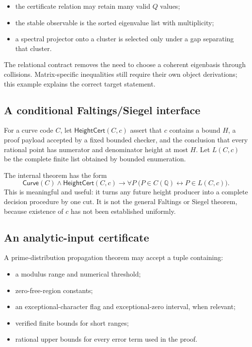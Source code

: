 \begin{itemize}
  \item the certificate relation may retain many valid $Q$ values;
  \item the stable observable is the sorted eigenvalue list with multiplicity;
  \item a spectral projector onto a cluster is selected only under a gap separating that cluster.
\end{itemize}

The relational contract removes the need to choose a coherent eigenbasis through collisions.  Matrix-specific inequalities still require their own object derivations; this example explains the correct target statement.

\subsection{A conditional Faltings/Siegel interface}

For a curve code $C$, let $\mathsf{HeightCert}(C,c)$ assert that $c$ contains a bound $H$, a proof payload accepted by a fixed bounded checker, and the conclusion that every rational point has numerator and denominator height at most $H$.  Let $L(C,c)$ be the complete finite list obtained by bounded enumeration.

The internal theorem has the form
\[
 \mathsf{Curve}(C)\wedge\mathsf{HeightCert}(C,c)
 \longrightarrow
 \forall P\;\bigl(P\in C(\mathbb Q)\leftrightarrow P\in L(C,c)\bigr).
\]
This is meaningful and useful: it turns any future height producer into a complete decision procedure by one cut.  It is not the general Faltings or Siegel theorem, because existence of $c$ has not been established uniformly.

\subsection{An analytic-input certificate}

A prime-distribution propagation theorem may accept a tuple containing:

\begin{itemize}
  \item a modulus range and numerical threshold;
  \item zero-free-region constants;
  \item an exceptional-character flag and exceptional-zero interval, when relevant;
  \item verified finite bounds for short ranges;
  \item rational upper bounds for every error term used in the proof.
\end{itemize}

